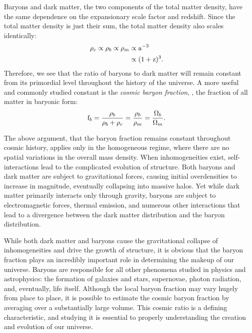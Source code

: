 Baryons and dark matter, the two components of the total matter
density, have the same dependence on the expansionary scale factor
and redshift. Since the total matter density is just their sum, the
total matter density also scales identically:
\begin{align}
\rho_c \propto \rho_b \propto \rho_m & \propto \textrm{a}^{-3} \nonumber \\
& \propto (1+\textrm{z})^{3}. \nonumber
\end{align}
Therefore, we see that the ratio of baryons to dark matter will remain
constant from its primordial level throughout the history of the
universe. A more useful and commonly studied constant is the
\textit{cosmic baryon fraction}, \fb, the fraction of all matter in
baryonic form:
\begin{equation}
\textrm{f\ensuremath{_b}} = \frac{\rho_b}{\rho_b + \rho_c} = \frac{\rho_b}{\rho_m} =
\frac{\Omega_b}{\Omega_m}.
\end{equation}

The above argument, that the baryon fraction remains constant
throughout cosmic history, applies only in the homogeneous regime,
where there are no spatial variations in the overall mass
density. When inhomogeneities exist, self-interactions lead to the
complicated evolution of structure. Both baryons and dark matter are
subject to gravitational forces, causing initial overdensities to
increase in magnitude, eventually collapsing into massive halos. Yet
while dark matter primarily interacts only through gravity, baryons
are subject to electromagnetic forces, thermal emission, and numerous
other interactions that lead to a divergence between the dark matter
distribution and the baryon distribution.

While both dark matter and baryons cause the gravitational collapse of
inhomogeneities and drive the growth of structure, it is obvious that
the baryon fraction plays an incredibly important role in determining
the makeup of our universe. Baryons are responsible for all other
phenomena studied in physics and astrophysics: the formation of
galaxies and stars, supernovae, photon radiation, and, eventually,
life itself. Although the local baryon fraction may vary hugely from
place to place, it is possible to estimate the cosmic baryon fraction
by averaging over a substantially large volume. This cosmic ratio is
a defining characteristic, and studying it is essential to properly
understanding the creation and evolution of our universe. 

